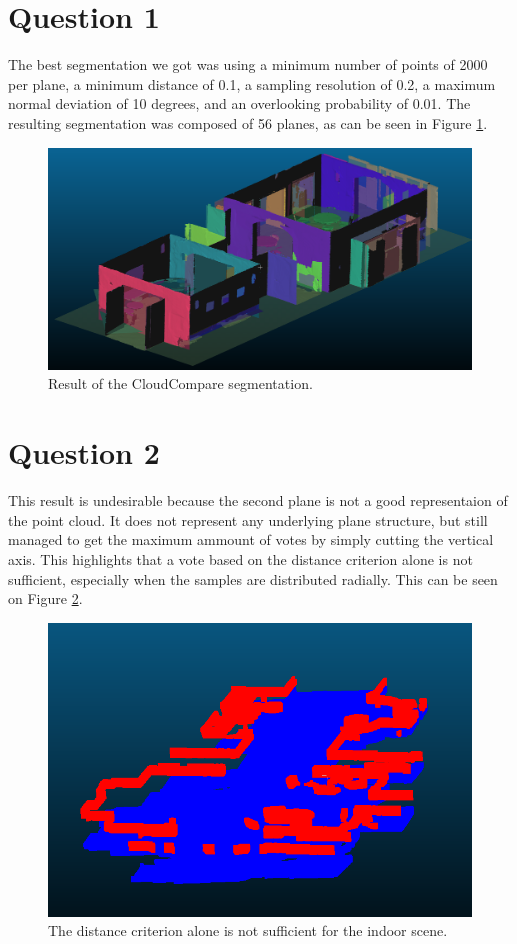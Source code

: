 \documentclass[a4paper]{article}
\begin{document}





\section*{Question 1}

The best segmentation we got was using a minimum number of points of 2000 per plane, a minimum distance of 0.1, a sampling resolution of 0.2, a maximum normal deviation of 10 degrees, and an overlooking probability of 0.01.
The resulting segmentation was composed of 56 planes, as can be seen in Figure \ref{fig:Q1}.

\begin{figure}[ht]
    \centering
    \includegraphics[width=0.3\linewidth]{figures/Q1.png}
    \caption{Result of the CloudCompare segmentation.}
    \label{fig:Q1}
\end{figure}


\section*{Question 2}

This result is undesirable because the second plane is not a good representaion of the point cloud. It does not represent any underlying plane structure,
but still managed to get the maximum ammount of votes by simply cutting the vertical axis. This highlights that a vote based on the distance criterion alone is not sufficient, especially 
when the samples are distributed radially. This can be seen on Figure \ref{fig:Q2}.

\begin{figure}[ht]
    \centering
    \includegraphics[width=0.3\linewidth]{figures/Q2.png}
    \caption{The distance criterion alone is not sufficient for the indoor scene.}
    \label{fig:Q2}
\end{figure}
\end{document}
